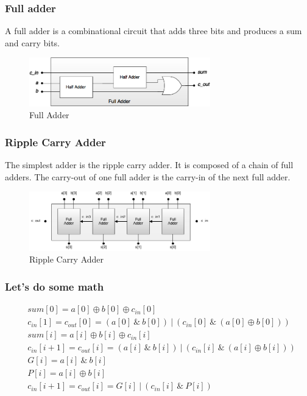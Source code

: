 \begin{frame}
    \frametitle{Full adder}
 A full adder is a combinational circuit that adds three bits and produces a sum and carry bits.
    \begin{figure}
        \centering
        \includegraphics[width=0.7\textwidth]{media/full-adder-gates.png}
        \caption{Full Adder}
    \end{figure}
\end{frame}

\begin{frame}
    \frametitle{Ripple Carry Adder}
 The simplest adder is the ripple carry adder.
 It is composed of a chain of full adders.
 The carry-out of one full adder is the carry-in of the next full adder.
    \begin{figure}
        \centering
        \includegraphics[width=0.7\textwidth]{media/ripple-carry.png}
        \caption{Ripple Carry Adder}
    \end{figure}
\end{frame}

\begin{frame}
    \frametitle{Let's do some math}
    \begin{equation}
        \begin{aligned}
            &sum[0]=a[0] \oplus b[0] \oplus c_{in}[0]\\
            &c_{in}[1]=c_{out}[0]=(a[0]\ \& \ b[0]) \ | \ (c_{in}[0] \ \& \ (a[0] \oplus b[0]))\\
            &sum[i]=a[i] \oplus b[i] \oplus c_{in}[i]\\
            &c_{in}[i+1]=c_{out}[i]=(a[i] \ \& \ b[i]) \ | \ (c_{in}[i] \ \& \ (a[i] \oplus b[i]))\\
            &G[i]=a[i] \ \& \ b[i]\\
            &P[i]=a[i] \oplus b[i]\\
            &c_{in}[i+1]=c_{out}[i]=G[i] \ | \ (c_{in}[i] \ \& \ P[i])
        \end{aligned}
    \end{equation}
\end{frame}


